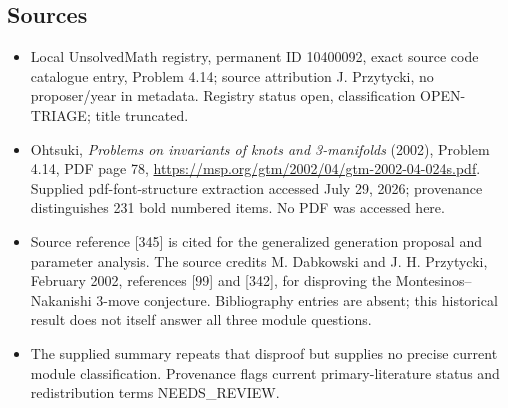 \documentclass[11pt]{article}
\begin{document}
\subsection{Sources}
\begin{itemize}
\item Local UnsolvedMath registry, permanent ID 10400092, exact source code catalogue entry, Problem 4.14; source attribution J. Przytycki, no proposer/year in metadata. Registry status open, classification OPEN-TRIAGE; title truncated.
\item Ohtsuki, \emph{Problems on invariants of knots and 3-manifolds} (2002), Problem 4.14, PDF page 78, \url{https://msp.org/gtm/2002/04/gtm-2002-04-024s.pdf}. Supplied pdf-font-structure extraction accessed July 29, 2026; provenance distinguishes 231 bold numbered items. No PDF was accessed here.
\item Source reference [345] is cited for the generalized generation proposal and parameter analysis. The source credits M. Dabkowski and J. H. Przytycki, February 2002, references [99] and [342], for disproving the Montesinos--Nakanishi 3-move conjecture. Bibliography entries are absent; this historical result does not itself answer all three module questions.
\item The supplied summary repeats that disproof but supplies no precise current module classification. Provenance flags current primary-literature status and redistribution terms NEEDS\_REVIEW.
\end{itemize}
\end{document}

